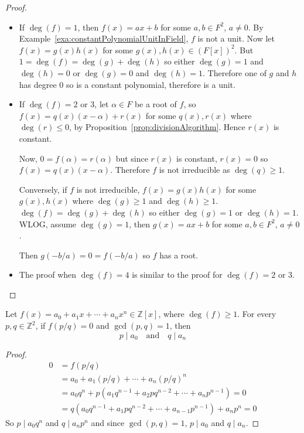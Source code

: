 \begin{proof}
	\hfill
	\begin{itemize}
		\item If $\deg(f) = 1$, then $f(x) = ax + b$ for some $a, b \in F^2$, $a \ne 0$. By Example~\ref{exa:constantPolynomialUnitInField}, $f$ is not a unit. Now let $f(x) = g(x) h(x)$ for some $g(x), h(x) \in {(F[x])}^2$. But $1 = \deg(f) = \deg(g) + \deg(h)$ so either $\deg(g) = 1$ and $\deg(h) = 0$ or $\deg(g) = 0$ and $\deg(h) = 1$. Therefore one of $g$ and $h$ has degree $0$ so is a constant polynomial, therefore is a unit.
		\item If $\deg(f) = 2 \text{ or } 3$, let $\alpha \in F$ be a root of $f$, so $f(x) = q(x) (x - \alpha) + r(x)$ for some $q(x), r(x)$ where $\deg(r) \le 0$, by Proposition~\ref{prop:divisionAlgorithm}. Hence $r(x)$ is constant.
		
		Now, $0 = f(\alpha) = r(\alpha)$ but since $r(x)$ is constant, $r(x) = 0$ so $f(x) = q(x) (x - \alpha)$. Therefore $f$ is not irreducible as $\deg(q) \ge 1$.

		Conversely, if $f$ is not irreducible, $f(x) = g(x) h(x)$ for some $g(x), h(x)$ where $\deg(g) \ge 1$ and $\deg(h) \ge 1$. $\deg(f) = \deg(g) + \deg(h)$ so either $\deg(g) = 1$ or $\deg(h) = 1$. WLOG, assume $\deg(g) = 1$, then $g(x) = ax + b$ for some $a, b \in F^2$, $a \ne 0$.

		Then $g(-b/a) = 0 = f(-b/a)$ so $f$ has a root.
		\item The proof when $\deg(f) = 4$ is similar to the proof for $\deg(f) = 2 \text{ or } 3$.
	\end{itemize}
\end{proof}

\begin{proposition}
	Let $f(x) = a_0 + a_1 x + \cdots + a_n x^n \in \mathbb{Z}[x]$, where $\deg(f) \ge 1$. For every $p, q \in \mathbb{Z}^2$, if $f(p / q) = 0$ and $\gcd(p, q) = 1$, then
	\[
		p \mid a_0 \quad \text{and} \quad q \mid a_n
	\]
\end{proposition}

\begin{proof}
	\[
		\begin{aligned}
			0
				& = f(p/q) \\
				& = a_0 + a_1 (p/q) + \cdots + a_n {(p/q)}^n \\
				& = a_0 q^n + p \left( a_1 q^{n - 1} + a_2 p q^{n - 2} + \cdots + a_n p^{n - 1} \right) = 0 \\
				& = q(a_0 q^{n - 1} + a_1 p q^{n - 2} + \cdots + a_{n - 1} p^{n - 1}) + a_n p^n = 0
		\end{aligned}
	\]
	So $p \mid a_0 q^n$ and $q \mid a_n p^n$ and since $\gcd(p, q) = 1$, $p \mid a_0$ and $q \mid a_n$.
\end{proof}

